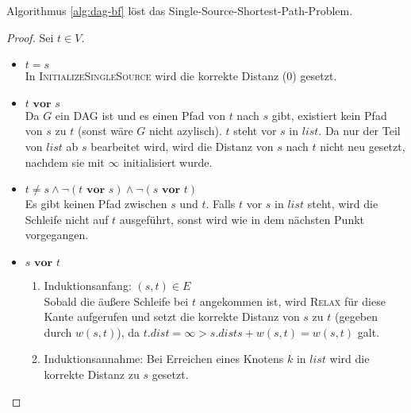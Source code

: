 \documentclass[a4paper]{scrartcl}
\begin{document}
\begin{behaupt}
    Algorithmus \ref{alg:dag-bf} löst das Single-Source-Shortest-Path-Problem.
\end{behaupt}
\begin{proof}
    Sei $t \in V$.
    \begin{itemize}
        \item $t = s$ \\
            In \textsc{InitializeSingleSource} wird die korrekte Distanz (0) gesetzt.

        \item $t \textbf{ vor } s$ \\
            Da $G$ ein DAG ist und es einen Pfad von $t$ nach $s$ gibt,
            existiert kein Pfad von $s$ zu $t$ (sonst wäre $G$ nicht azylisch).
            $t$ steht vor $s$ in $list$.
            Da nur der Teil von $list$ ab $s$ bearbeitet wird, wird die Distanz
            von $s$ nach $t$ nicht neu gesetzt, nachdem sie mit $\infty$
            initialisiert wurde.

        \item $t \neq s \land \lnot (t \textbf{ vor } s) \land \lnot (s \textbf{ vor } t)$ \\
            Es gibt keinen Pfad zwischen $s$ und $t$.
            Falls $t$ vor $s$ in $list$ steht, wird die Schleife nicht auf $t$
            ausgeführt, sonst wird wie in dem nächsten Punkt vorgegangen.

        \item $s \textbf{ vor } t$
            \begin{enumerate}
                \item Induktionsanfang: $(s, t) \in E$ \\
                    Sobald die äußere Schleife bei $t$ angekommen ist, wird
                    \textsc{Relax} für diese Kante aufgerufen und setzt die
                    korrekte Distanz von $s$ zu $t$ (gegeben durch $w(s, t)$),
                    da $t.dist = \infty > s.dists + w(s, t) = w(s, t)$ galt.

                \item Induktionsannahme: Bei Erreichen eines Knotens $k$ in
                    $list$ wird die korrekte Distanz zu $s$ gesetzt.


\end{enumerate}
\end{itemize}
\end{proof}
\end{document}
